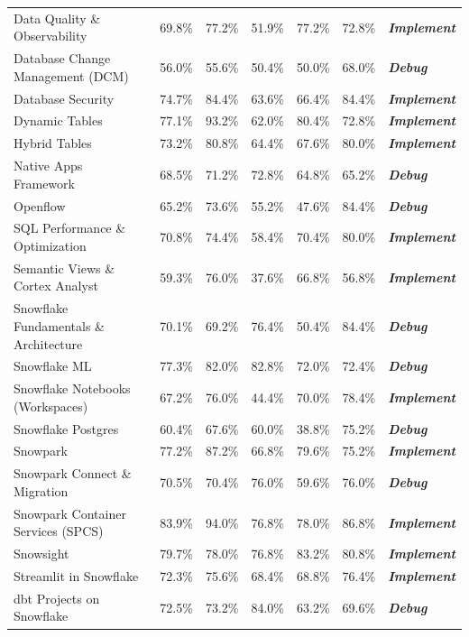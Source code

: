 \documentclass[10pt,letterpaper]{article}
\begin{document}
\begin{table}[tbp]
\begin{tabularx}{\linewidth}{@{}X r r r r r l@{}}
Data Quality \& Observability           & 69.8\% & 77.2\% & 51.9\% & 77.2\% & 72.8\% & \textbf{\textit{Implement}} \\
Database Change Management (DCM)        & 56.0\% & 55.6\% & 50.4\% & 50.0\% & 68.0\% & \textbf{\textit{Debug}} \\
Database Security                       & 74.7\% & 84.4\% & 63.6\% & 66.4\% & 84.4\% & \textbf{\textit{Implement}} \\
Dynamic Tables                          & 77.1\% & 93.2\% & 62.0\% & 80.4\% & 72.8\% & \textbf{\textit{Implement}} \\
Hybrid Tables                           & 73.2\% & 80.8\% & 64.4\% & 67.6\% & 80.0\% & \textbf{\textit{Implement}} \\
Native Apps Framework                   & 68.5\% & 71.2\% & 72.8\% & 64.8\% & 65.2\% & \textbf{\textit{Debug}} \\
Openflow                                & 65.2\% & 73.6\% & 55.2\% & 47.6\% & 84.4\% & \textbf{\textit{Debug}} \\
SQL Performance \& Optimization         & 70.8\% & 74.4\% & 58.4\% & 70.4\% & 80.0\% & \textbf{\textit{Implement}} \\
Semantic Views \& Cortex Analyst        & 59.3\% & 76.0\% & 37.6\% & 66.8\% & 56.8\% & \textbf{\textit{Implement}} \\
Snowflake Fundamentals \& Architecture  & 70.1\% & 69.2\% & 76.4\% & 50.4\% & 84.4\% & \textbf{\textit{Debug}} \\
Snowflake ML                            & 77.3\% & 82.0\% & 82.8\% & 72.0\% & 72.4\% & \textbf{\textit{Debug}} \\
Snowflake Notebooks (Workspaces)        & 67.2\% & 76.0\% & 44.4\% & 70.0\% & 78.4\% & \textbf{\textit{Implement}} \\
Snowflake Postgres                      & 60.4\% & 67.6\% & 60.0\% & 38.8\% & 75.2\% & \textbf{\textit{Debug}} \\
Snowpark                                & 77.2\% & 87.2\% & 66.8\% & 79.6\% & 75.2\% & \textbf{\textit{Implement}} \\
Snowpark Connect \& Migration           & 70.5\% & 70.4\% & 76.0\% & 59.6\% & 76.0\% & \textbf{\textit{Debug}} \\
Snowpark Container Services (SPCS)      & 83.9\% & 94.0\% & 76.8\% & 78.0\% & 86.8\% & \textbf{\textit{Implement}} \\
Snowsight                               & 79.7\% & 78.0\% & 76.8\% & 83.2\% & 80.8\% & \textbf{\textit{Implement}} \\
Streamlit in Snowflake                  & 72.3\% & 75.6\% & 68.4\% & 68.8\% & 76.4\% & \textbf{\textit{Implement}} \\
dbt Projects on Snowflake               & 72.5\% & 73.2\% & 84.0\% & 63.2\% & 69.6\% & \textbf{\textit{Debug}} \\
\bottomrule
\end{tabularx}
\end{table}
\end{document}

